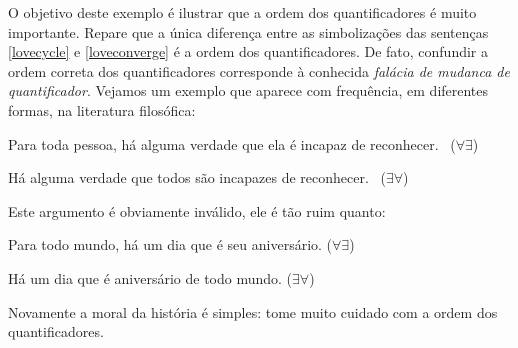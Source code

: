 O objetivo deste exemplo é ilustrar que a ordem dos quantificadores é muito importante.
Repare que a única diferença entre as simbolizações das sentenças \ref{lovecycle} e \ref{loveconverge} é a ordem dos quantificadores.
De fato, confundir a ordem correta dos quantificadores corresponde à conhecida \emph{falácia de mudanca de quantificador}.
Vejamos um exemplo que aparece com frequência, em diferentes formas, na literatura filosófica:
	\begin{earg}
		\item[] Para toda pessoa, há alguma verdade que ela é incapaz de reconhecer. \ ($\forall \exists$)
		\item[\therefore] Há alguma verdade que todos são incapazes de reconhecer. \ ($\exists \forall$)
	\end{earg}
Este argumento é obviamente inválido, ele é tão ruim quanto:
	\begin{earg}
		\item[] Para todo mundo, há um dia que é seu aniversário. \hfill ($\forall \exists$)
		\item[\therefore] Há um dia que é aniversário de todo mundo. \hfill ($\exists \forall$)
	\end{earg} 
Novamente a moral da história é simples:
tome muito cuidado com a ordem dos quantificadores.



